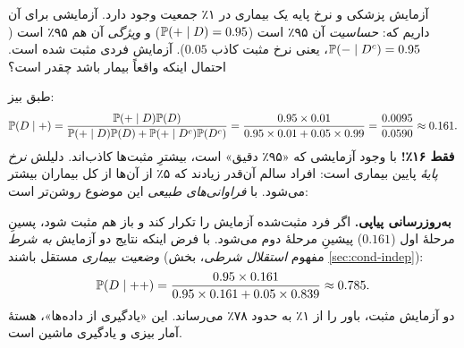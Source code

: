 \begin{example}[label=ex:medical]{آزمایش پزشکی و نرخ پایه}
یک بیماری در ۱٪ جمعیت وجود دارد. آزمایشی برای آن داریم که:
\emph{حساسیت} آن ۹۵٪ است ($\P(+\mid D)=0.95$) و \emph{ویژگی} آن هم ۹۵٪ است ($\P(-\mid D^c)=0.95$، یعنی نرخ مثبت کاذب $0.05$).
آزمایش فردی مثبت شده است. احتمال اینکه واقعاً بیمار باشد چقدر است؟
\begin{solution}
طبق بیز:
\[ \P(D\mid +)=\frac{\P(+\mid D)\P(D)}{\P(+\mid D)\P(D)+\P(+\mid D^c)\P(D^c)}
=\frac{0.95\times0.01}{0.95\times0.01+0.05\times0.99}=\frac{0.0095}{0.0590}\approx0.161. \]
\textbf{فقط ۱۶٪!} با وجود آزمایشی که «۹۵٪ دقیق» است، بیشترِ مثبت‌ها کاذب‌اند. دلیلش \emph{نرخ پایهٔ} پایین بیماری است: افراد سالم آن‌قدر زیادند که ۵٪ از آن‌ها از کل بیماران بیشتر می‌شود. با \emph{فراوانی‌های طبیعی} این موضوع روشن‌تر است:
\begin{center}
\end{center}
\end{solution}
\end{example}

\begin{note}
\textbf{به‌روزرسانی پیاپی.} اگر فرد مثبت‌شده آزمایش را تکرار کند و باز هم مثبت شود، پسینِ مرحلهٔ اول ($0.161$) پیشینِ مرحلهٔ دوم می‌شود. با فرض اینکه نتایج دو آزمایش \emph{به شرط وضعیت بیماری} مستقل باشند (مفهوم \emph{استقلال شرطی}، بخش \ref{sec:cond-indep}):
\[ \P(D\mid ++)=\frac{0.95\times0.161}{0.95\times0.161+0.05\times0.839}\approx0.785. \]
دو آزمایش مثبت، باور را از ۱٪ به حدود ۷۸٪ می‌رساند. این «یادگیری از داده‌ها»، هستهٔ آمار بیزی و یادگیری ماشین است.
\end{note}

